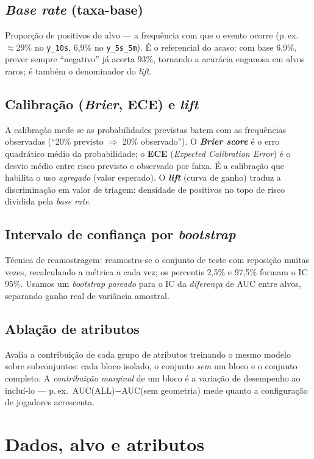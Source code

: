 \documentclass[a4paper,11pt]{article}
\begin{document}
\subsection{\emph{Base rate} (taxa-base)}
Proporção de positivos do alvo --- a frequência com que o evento ocorre (p.\,ex.\ $\approx$29\% no \texttt{y\_10s}, 6,9\% no \texttt{y\_5s\_5m}). É o referencial do acaso: com base 6,9\%, prever sempre ``negativo'' já acerta 93\%, tornando a acurácia enganosa em alvos raros; é também o denominador do \emph{lift}.

\subsection{Calibração (\emph{Brier}, ECE) e \emph{lift}}
A calibração mede se as probabilidades previstas batem com as frequências observadas (``20\% previsto $\Rightarrow$ 20\% observado''). O \textbf{\emph{Brier score}} é o erro quadrático médio da probabilidade; o \textbf{ECE} (\emph{Expected Calibration Error}) é o desvio médio entre risco previsto e observado por faixa. É a calibração que habilita o uso \emph{agregado} (valor esperado). O \textbf{\emph{lift}} (curva de ganho) traduz a discriminação em valor de triagem: densidade de positivos no topo de risco dividida pela \emph{base rate}.

\subsection{Intervalo de confiança por \emph{bootstrap}}
Técnica de reamostragem: reamostra-se o conjunto de teste com reposição muitas vezes, recalculando a métrica a cada vez; os percentis 2,5\% e 97,5\% formam o IC 95\%. Usamos um \emph{bootstrap pareado} para o IC da \emph{diferença} de AUC entre alvos, separando ganho real de variância amostral.

\subsection{Ablação de atributos}\label{sub:ablacao}
Avalia a contribuição de cada grupo de atributos treinando o mesmo modelo sobre subconjuntos: cada bloco isolado, o conjunto \emph{sem} um bloco e o conjunto completo. A \emph{contribuição marginal} de um bloco é a variação de desempenho ao incluí-lo --- p.\,ex.\ AUC(ALL)$-$AUC(sem geometria) mede quanto a configuração de jogadores acrescenta.

\section{Dados, alvo e atributos}\label{sec:dados}
\end{document}

